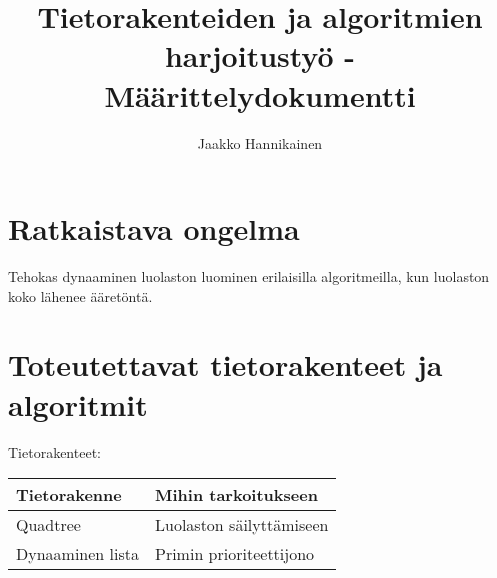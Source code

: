 \documentclass{article}
\author{Jaakko Hannikainen}
\title{Tietorakenteiden ja algoritmien harjoitustyö - Määrittelydokumentti}
\begin{document}
\maketitle

\section{Ratkaistava ongelma}
Tehokas dynaaminen luolaston luominen erilaisilla algoritmeilla, kun luolaston
koko lähenee ääretöntä.

\section{Toteutettavat tietorakenteet ja algoritmit}
Tietorakenteet:

\begin{table}[h]
\begin{tabular}{| l | l |}
\hline
\rowcolor{Gray}
Tietorakenne               & Mihin tarkoitukseen      \\ \hline
Quadtree                   & Luolaston säilyttämiseen \\ \hline
Dynaaminen lista           & Primin prioriteettijono  \\ \hline
\end{tabular}
\end{table}
\end{document}
